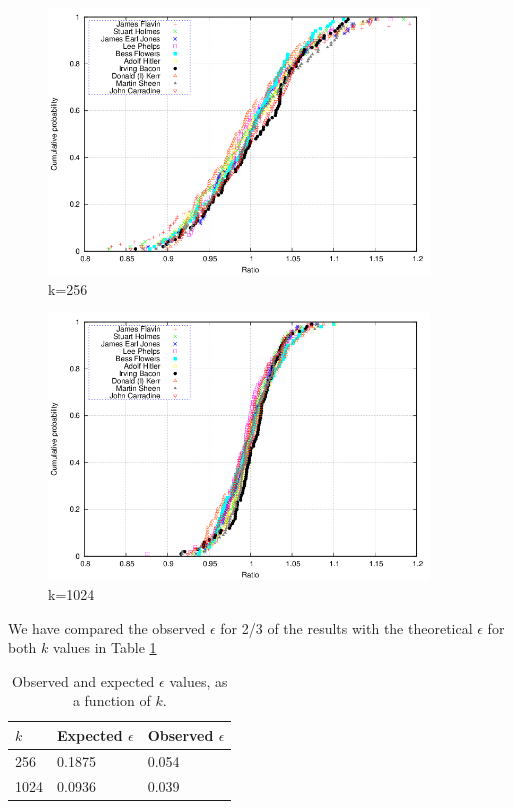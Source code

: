 \documentclass[a4paper,11pt]{article}
\begin{document}
\begin{figure}[H]
\centering \includegraphics[width=0.9\textwidth]{plot256.png}
\caption{k=256}\label{fig:k256}
\label{fig:exp256}
\end{figure}
\begin{figure}[H]
\centering \includegraphics[width=0.9\textwidth]{plot1024.png}
\caption{k=1024}\label{fig:k1024}
\label{fig:exp1024}
\end{figure}

We have compared the observed $\epsilon$ for 2/3 of the results with the theoretical $\epsilon$ for both $k$ values in Table \ref{tab:epsilon}

\begin{table}[H]
    \begin{center}
    \begin{tabular}{l|l|l}
    $k$    & Expected $\epsilon$      & Observed $\epsilon$ \\ \hline
    256  & 0.1875 & 0.054      \\ \hline
    1024 & 0.0936 & 0.039      \\
    \end{tabular}
    \end{center}
\caption{Observed and expected $\epsilon$ values, as a function of $k$.}\label{tab:epsilon}
\end{table}
\end{document}
